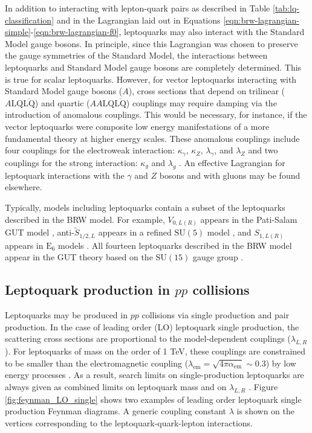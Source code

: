 In addition to interacting with lepton-quark pairs as
described in Table \ref{tab:lq-classification} and in the Lagrangian laid out 
in Equations \ref{eqn:brw-lagrangian-simple}-\ref{eqn:brw-lagrangian-f0},
leptoquarks may also interact with the Standard Model
gauge bosons.  
In principle, since this Lagrangian was chosen to preserve
the gauge symmetries of the Standard Model, the interactions 
between leptoquarks and Standard Model gauge bosons are completely determined.
This is true for scalar leptoquarks.
However, for vector leptoquarks interacting with Standard Model gauge bosons ($A$), cross
sections that depend on trilinear ($A\text{LQ}\overline{\text{LQ}}$) and
quartic ($AA\text{LQ}\overline{\text{LQ}}$) couplings may require
damping via the introduction of anomalous couplings.  
This would be necessary, for instance, if the vector leptoquarks
were composite low energy manifestations of a more fundamental theory at higher energy scales.
These anomalous couplings include 
four couplings for the electroweak interaction:
$\kappa_\gamma$, $\kappa_Z$, $\lambda_\gamma$, and $\lambda_Z$ and two 
couplings for the strong interaction: $\kappa_g$ and $\lambda_g$
\cite{lq-vector-to-gauge-bosons-quartic-trilinear-1,lq-vector-to-gauge-bosons-quartic-trilinear-2}.
An effective Lagrangian for leptoquark interactions with the $\gamma$ and $Z$ bosons
\cite{lq-classification,lq-vector-to-zgamma} and with gluons \cite{lq-vector-to-gluons} may be found elsewhere.

Typically, models including leptoquarks contain a subset of the leptoquarks
described in the BRW model.  For example, 
$V_{0,L(R)}$ appears in the Pati-Salam GUT model \cite{pati-salam-su4-1,pati-salam-su4-2},
anti-${\tilde S}_{1/2,L}$ appears in a refined $\text{SU}(5)$ model \cite{su5-1,su5-2}, and
$S_{1,L(R)}$ appears in $\text{E}_6$ models \cite{superstring_e6}.
All fourteen leptoquarks described in the BRW model appear in the GUT theory 
based on the $\text{SU}(15)$ gauge group \cite{su15-1,su15-2}.

\subsection{Leptoquark production in $pp$ collisions}
\label{sec:lq-ppcollisions}

Leptoquarks may be produced in $pp$ collisions via single production and pair production.
In the case of leading order (LO) leptoquark single production, the scattering cross
sections are proportional to the model-dependent couplings ($\lambda_{L,R}$).
For leptoquarks of mass on the order of 1 TeV, these couplings 
are constrained to be smaller than the electromagnetic coupling 
($\lambda_{\text{em}} = \sqrt{4\pi\alpha_{\text{em}}} \sim 0.3$) by low energy processes 
\cite{small-yukawa-1,small-yukawa-2,small-yukawa-3,small-yukawa-4}.
As a result, search limits on single-production leptoquarks are always
given as combined limits on leptoquark mass and on $\lambda_{L,R}$
\cite{single-lq-1,single-lq-2,single-lq-3}.
Figure \ref{fig:feynman_LO_single} shows two examples of leading order leptoquark single production
Feynman diagrams.  
A generic coupling constant $\lambda$ is shown on the vertices corresponding to the leptoquark-quark-lepton
interactions.

